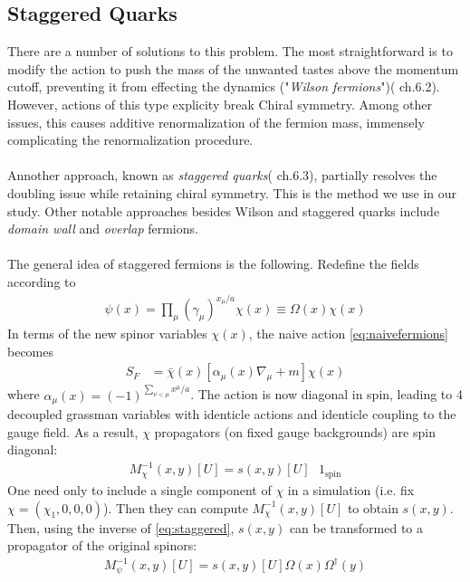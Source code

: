 \subsection{Staggered Quarks}


There are a number of solutions to this problem. The most straightforward is to modify the action to push the mass of the unwanted tastes above the momentum cutoff, preventing it from effecting the dynamics ("\textit{Wilson fermions}")(\cite{DeGrand:2006zz} ch.6.2). However, actions of this type explicity break Chiral symmetry. Among other issues, this causes additive renormalization of the fermion mass, immensely complicating the renormalization procedure.
\\ \\
Annother approach, known as \textit{staggered quarks}(\cite{DeGrand:2006zz} ch.6.3), partially resolves the doubling issue while retaining chiral symmetry. This is the method we use in our study. Other notable approaches besides Wilson and staggered quarks include \textit{domain wall} \cite{Jansen:1994ym} and \textit{overlap} \cite{Narayanan:2011qj} fermions.
\\ \\
The general idea of staggered fermions is the following.
Redefine the fields according to
\begin{align}
 \psi(x) = \prod_{\mu}(\gamma_{\mu})^{x_{\mu}/a} \chi(x) \equiv \Omega(x) \chi(x)
 \label{eq:staggered}
\end{align}
In terms of the new spinor variables $\chi(x)$, the naive action \eqref{eq:naivefermions} becomes
\begin{align}
  S_F &= \bar{\chi}(x)[\alpha_{\mu}(x) \nabla_{\mu} + m ] \chi(x)
\end{align}
where $\alpha_{\mu}(x) = (-1)^{\sum_{\nu < \mu} x^{\mu}/a}$. The action is now diagonal in spin, leading to 4 decoupled grassman variables with identicle actions and identicle coupling to the gauge field. As a result, $\chi$ propagators (on fixed gauge backgrounds) are spin diagonal:
\begin{align}
	M^{-1}_{\chi}(x,y)[U] = s(x,y)[U] \text{ } 1_{\text{spin}}
\end{align}
One need only to include a single component of $\chi$ in a simulation (i.e. fix $\chi = (\chi_1,0,0,0)$). Then they can compute $M^{-1}_{\chi}(x,y)[U]$ to obtain $s(x,y)$. Then, using the inverse of \eqref{eq:staggered}, $s(x,y)$ can be transformed to a propagator of the original spinors:
\begin{align}
	M_{\psi}^{-1}(x,y)[U] = s(x,y)[U] \Omega(x) \Omega^{\dagger}(y)
\end{align}
